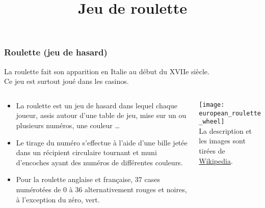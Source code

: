 \documentclass[10pt]{beamer}
\title{Jeu de roulette}
\begin{document}
\maketitle



\begin{frame}
  \frametitle{Roulette (jeu de hasard)}
  
  La roulette fait son apparition en Italie au début du XVIIe siècle. \\
  Ce jeu est surtout joué dans les casinos.
  
  \begin{columns}[c]
    \begin{column}{0.58\textwidth}
      \begin{itemize}
      \item La roulette est un jeu de hasard dans lequel chaque joueur, assis autour d'une table de jeu, mise sur un ou plusieurs numéros, une couleur \dots 
      \item Le tirage du numéro s'effectue à l'aide d'une bille jetée dans un récipient circulaire tournant et muni d'encoches ayant des numéros de différentes couleurs.
      \item Pour la roulette anglaise et française, 37 cases numérotées de 0 à 36 alternativement rouges et noires, à l'exception du zéro, vert.
    \end{itemize}
  \end{column}
  \begin{column}{0.42\textwidth}
    \texttt{[image: european\_roulette\_wheel]}
    \\
    \footnotesize{La description et les images sont tirées de \href{https://fr.wikipedia.org/wiki/Roulette_(jeu_de_hasard)}{Wikipedia}.}
  \end{column}
\end{columns}

\end{frame}
\end{document}
